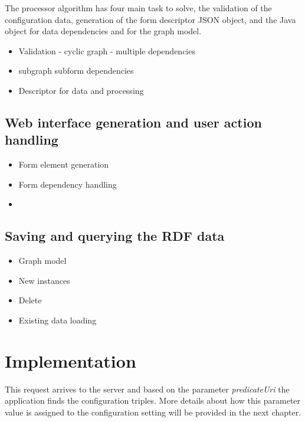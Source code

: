 The processor algorithm has four main task to solve, the validation of the configuration data, generation of the form descriptor JSON object, and the Java object for data dependencies and for  the graph model. 


\begin{itemize}	
	\item{Validation - cyclic graph - multiple dependencies}
	\item{subgraph subform dependencies}
	\item{Descriptor for data and processing}
\end{itemize}







\subsection{Web interface generation and user action handling}  \label{512}
\begin{itemize}	
	\item{Form element generation}
	\item{Form dependency handling}
	\item{}
\end{itemize}


\subsection{Saving and querying the RDF data}  \label{513}


\begin{itemize}	
	\item{Graph model}
	\item{New instances}
	\item{Delete}
	\item{Existing data loading}
\end{itemize}


\section{Implementation} \label{52}


This request arrives to the server and based on the parameter \textit{predicateUri} the application finds the configuration triples. More details about how this parameter value is assigned to the configuration setting will be provided in the next chapter.

